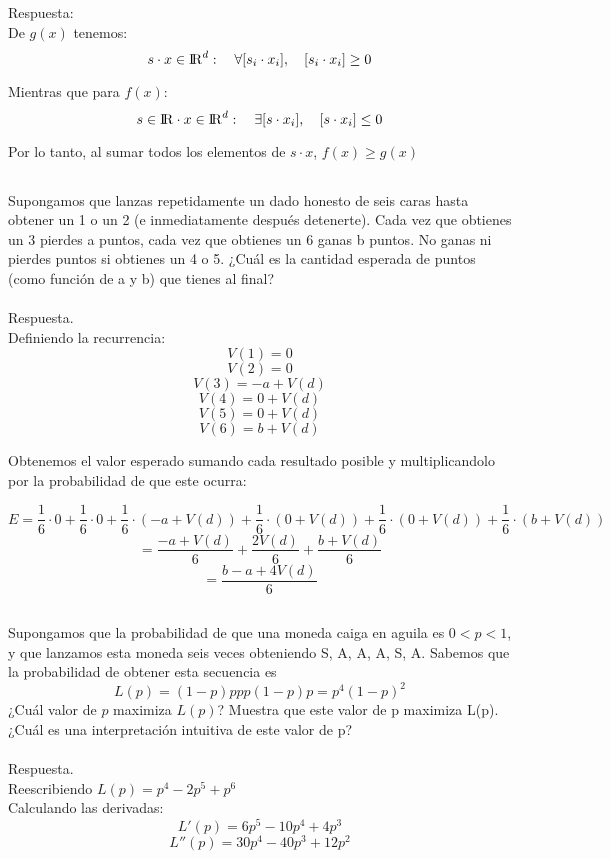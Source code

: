 \documentclass{article}
\begin{document}
Respuesta: \\
De $g(x)$ tenemos: 
\[s\cdot x \in {\rm I\!R}^d:\quad \forall [s_i \cdot x_i],\quad [s_i \cdot x_i] \geq 0\]

Mientras que para $f(x)$: 
\[ s \in {\rm I\!R} \cdot x \in {\rm I\!R}^d:\quad  \exists [s \cdot x_i], \quad [s \cdot x_i] \leq 0\]

Por lo tanto, al sumar todos los elementos de  $s\cdot x$,  $f(x) \geq g(x)$


 \subsection{}
Supongamos que lanzas repetidamente un dado honesto de seis caras hasta obtener un 1 o un 2 (e inmediatamente después detenerte). Cada vez que obtienes un 3 pierdes a puntos, cada vez que obtienes un 6 ganas b puntos. No ganas ni pierdes puntos si obtienes un 4 o 5. ¿Cuál es la cantidad esperada de puntos (como función de a y b) que tienes al final?\\
\\
Respuesta.\\
Definiendo la recurrencia:\\
\[V(1) = 0\] 
\[V(2) = 0\]
\[V(3) = -a + V(d)\]
\[V(4) = 0 + V(d)\]
\[V(5) = 0 + V(d)\]
\[V(6) = b + V(d)\]

Obtenemos el valor esperado sumando cada resultado posible y multiplicandolo por la probabilidad de que este ocurra:

\[ E = \dfrac{1}{6} \cdot 0 + \dfrac{1}{6} \cdot 0 + \dfrac{1}{6} \cdot (-a + V(d)) + \dfrac{1}{6} \cdot (0 + V(d)) + \dfrac{1}{6} \cdot (0 + V(d)) + \dfrac{1}{6} \cdot (b + V(d))\]
\[=\dfrac{-a + V(d)}{6} + \dfrac{2V(d)}{6} +\dfrac{b + V(d)}{6} \]
\[=\dfrac{b-a + 4V(d)}{6} \]

\subsection{}
Supongamos que la probabilidad de que una moneda caiga en aguila es $0 < p < 1$, y que lanzamos esta moneda seis veces obteniendo {S, A, A, A, S, A}. Sabemos que la probabilidad de obtener esta secuencia es
\[L(p) = (1 - p)ppp(1 - p)p = p^4(1 - p)^2\]
¿Cuál valor de $p$ maximiza $L(p)$? Muestra que este valor de p maximiza L(p). ¿Cuál es una interpretación intuitiva de este valor de p?\\
\\
Respuesta.\\
Reescribiendo $L(p) = p^4-2p^5+p^6$ \\
Calculando las derivadas:
\[L'(p) = 6p^5-10p^4+4p^3\]
\[L''(p) = 30p^4-40p^3+12p^2\]
\end{document}
